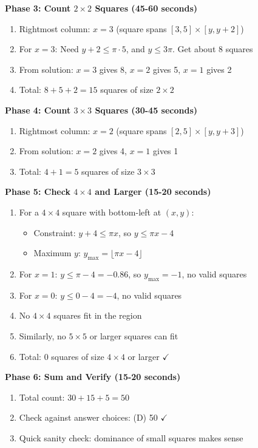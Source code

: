 \documentclass[12pt]{article}
\begin{document}
\begin{roadmapbox}
\textbf{Phase 3: Count $2 \times 2$ Squares (45-60 seconds)}
\begin{enumerate}[resume]
    \item Rightmost column: $x=3$ (square spans $[3,5] \times [y, y+2]$)
    \item For $x=3$: Need $y+2 \leq \pi \cdot 5$, and $y \leq 3\pi$. Get about 8 squares
    \item From solution: $x=3$ gives 8, $x=2$ gives 5, $x=1$ gives 2
    \item Total: $8 + 5 + 2 = 15$ squares of size $2 \times 2$
\end{enumerate}

\textbf{Phase 4: Count $3 \times 3$ Squares (30-45 seconds)}
\begin{enumerate}[resume]
    \item Rightmost column: $x=2$ (square spans $[2,5] \times [y, y+3]$)
    \item From solution: $x=2$ gives 4, $x=1$ gives 1
    \item Total: $4 + 1 = 5$ squares of size $3 \times 3$
\end{enumerate}

\textbf{Phase 5: Check $4 \times 4$ and Larger (15-20 seconds)}
\begin{enumerate}[resume]
    \item For a $4 \times 4$ square with bottom-left at $(x, y)$:
    \begin{itemize}
        \item Constraint: $y+4 \leq \pi x$, so $y \leq \pi x - 4$
        \item Maximum $y$: $y_{\max} = \lfloor \pi x - 4 \rfloor$
    \end{itemize}
    \item For $x=1$: $y \leq \pi - 4 = -0.86$, so $y_{\max} = -1$, no valid squares
    \item For $x=0$: $y \leq 0 - 4 = -4$, no valid squares
    \item No $4 \times 4$ squares fit in the region
    \item Similarly, no $5 \times 5$ or larger squares can fit
    \item Total: $\boxed{0}$ squares of size $4 \times 4$ or larger $\checkmark$
\end{enumerate}

\textbf{Phase 6: Sum and Verify (15-20 seconds)}
\begin{enumerate}[resume]
    \item Total count: $30 + 15 + 5 = 50$
    \item Check against answer choices: (D) 50 $\checkmark$
    \item Quick sanity check: dominance of small squares makes sense
\end{enumerate}


\end{roadmapbox}
\end{document}
